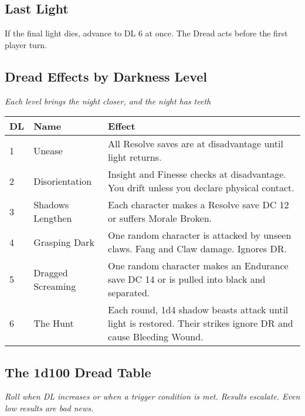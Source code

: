 \documentclass[10pt,twoside]{article}
\begin{document}
\subsection{Last Light}
If the final light dies, advance to DL 6 at once. The Dread acts before the first player turn.

\subsection{Dread Effects by Darkness Level}
\textit{Each level brings the night closer, and the night has teeth}

\begin{tabular}{@{}p{1cm}p{3cm}p{9cm}@{}}
\textbf{DL} & \textbf{Name} & \textbf{Effect} \\
\midrule
1 & Unease & All Resolve saves are at disadvantage until light returns. \\
2 & Disorientation & Insight and Finesse checks at disadvantage. You drift unless you declare physical contact. \\
3 & Shadows Lengthen & Each character makes a Resolve save DC 12 or suffers Morale Broken. \\
4 & Grasping Dark & One random character is attacked by unseen claws. Fang and Claw damage. Ignores DR. \\
5 & Dragged Screaming & One random character makes an Endurance save DC 14 or is pulled into black and separated. \\
6 & The Hunt & Each round, 1d4 shadow beasts attack until light is restored. Their strikes ignore DR and cause Bleeding Wound. \\
\end{tabular}

\subsection{The 1d100 Dread Table}
\textit{Roll when DL increases or when a trigger condition is met. Results escalate. Even low results are bad news.}
\end{document}
